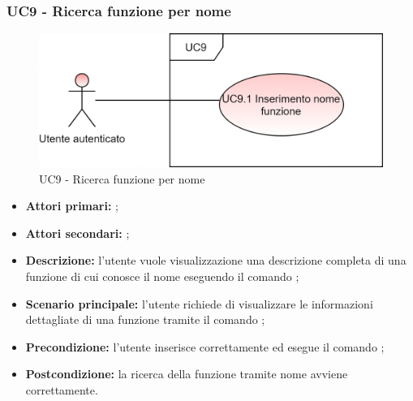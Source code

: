 \subsubsection{UC9 - Ricerca funzione per nome}
\begin{figure}[h]
	\centering
	\includegraphics[scale=\ucs]{./res/img/UC9.png}
	\caption {UC9 - Ricerca funzione per nome}
\end{figure}
\begin{itemize}
	\item \textbf{Attori primari:} \ua{};
	\item \textbf{Attori secondari:} \re{};
	\item \textbf{Descrizione:} l’utente vuole visualizzazione una descrizione completa di una funzione di cui conosce il nome eseguendo il comando \pinfo{};	
	\item \textbf{Scenario principale:} l'utente richiede di visualizzare le informazioni dettagliate di una funzione tramite il comando \pinfo{};
	\item \textbf{Precondizione:} l'utente inserisce correttamente ed esegue il comando \pinfo{};
	\item \textbf{Postcondizione:} la ricerca della funzione tramite nome avviene correttamente. 
\end{itemize}
